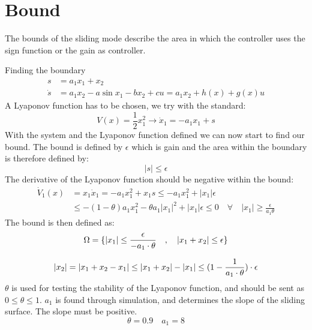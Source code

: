 \section{Bound} %
\label{sec:bound}
The bounds of the sliding mode describe the area in which the controller uses the sign function or the gain as controller.

Finding the boundary
\begin{equation}
  \begin{split}
    s &= a_1 x_1 + x_2 \\
    \dot{s} &= a_1 x_2 - a \sin x_1 - b x_2 + c u = a_1 x_2 + h(x) + g(x) u
  \end{split}
\end{equation}
A Lyaponov function has to be chosen, we try with the standard:
\begin{equation}
  V(x) = \frac{1}{2} x_1^2 \rightarrow \dot{x}_1 = -a_1 x_1 + s
\end{equation}
With the system and the Lyaponov function defined we can now start to find our bound. The bound is defined by $\epsilon$ which is gain and the area within the boundary is therefore defined by:
\begin{equation}
  \vert s \vert \leq \epsilon
\end{equation}
The derivative of the Lyaponov function should be negative within the bound:
\begin{equation}
        \begin{split}
                \dot{V}_1(x) &= x_1 \dot{x}_1 = -a_1 x_1^2 + x_1 s \leq -a_1 x_1^2 + |x_1| \epsilon \\
                &\leq -(1-\theta)a_1 x_1^2 - \theta a_1|x_1|^2 + |x_1|\epsilon \leq 0 \quad \forall \quad |x_1| \geq \frac{\epsilon}{a_1 \theta}
        \end{split}
\end{equation}
The bound is then defined as:
\begin{equation}
  \Omega = \{ |x_1| \leq \frac{\epsilon}{-a_1 \cdot \theta} \quad , \quad |x_1 + x_2| \leq \epsilon \}
\end{equation}

\begin{equation}
  |x_2| = |x_1 + x_2 - x_1| \leq |x_1 + x_2| - |x_1| \leq (1 - \frac{1}{a_1 \cdot \theta}) \cdot \epsilon
\end{equation}
$\theta$ is used for testing the stability of the Lyaponov function, and should be sent as $0 \leq \theta \leq 1$. $a_1$ is found through simulation, and determines the slope of the sliding surface. The slope must be positive.
\begin{equation}
  \theta = 0.9 \quad a_1 = 8
\end{equation}

